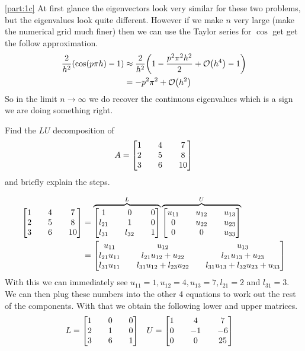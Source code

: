 \documentclass[boxes]{homework}
\begin{document}
\begin{solution}
	\ref{part:1c}
	At first glance the eigenvectors look very similar for these two problems, but the eigenvalues look quite different. However if we make $n$ very large (make the numerical grid much finer) then we can use the Taylor series for $\cos$ get get the follow approximation.
	\begin{align*}
		\frac{2}{h^2}\qty(\cos(p\pi h) - 1) & \approx\frac{2}{h^2}\qty(1 - \frac{p^2\pi^2h^2}{2} + \order{h^4}- 1) \\
		                                    & =-p^2\pi^2 + \order{h^2}
	\end{align*}
	So in the limit $n\to\infty$ we do recover the continuous eigenvalues which is a sign we are doing something right.
\end{solution}

\clearpage

\begin{problem}
Find the $LU$ decomposition of
\begin{equation*}
	A = \mqty[1 && 4 && 7 \\ 2 && 5 && 8 \\ 3 && 6 && 10]
\end{equation*}
and briefly explain the steps.
\end{problem}

\begin{solution}
	\begin{align*}
		\mqty[1 && 4 && 7 \\ 2 && 5 && 8 \\ 3 && 6 && 10] &= \overbrace{\mqty[1 && 0 && 0 \\ l_{21} && 1 && 0 \\ l_{31} && l_{32} && 1]}^L \overbrace{\mqty[u_{11} && u_{12} && u_{13} \\ 0 && u_{22} && u_{23} \\ 0 && 0 && u_{33}]}^U \\
		&= \mqty[u_{11} && u_{12} && u_{13} \\ l_{21}u_{11} && l_{21}u_{12} + u_{22} && l_{21}u_{13} + u_{23} \\ l_{31}u_{11} && l_{31}u_{12} + l_{23}u_{22} && l_{31}u_{13} + l_{32}u_{23} + u_{33}]
	\end{align*}
	With this we can immediately see $u_{11} = 1, u_{12} = 4, u_{13} = 7, l_{21} = 2$ and $l_{31} = 3$. We can then plug these numbers into the other 4 equations to work out the rest of the components. With that we obtain the following lower and upper matrices.
	\begin{align*}
		L &= \mqty[1 && 0 && 0 \\ 2 && 1 && 0 \\ 3 && 6 && 1] & U & = \mqty[1 && 4 && 7 \\ 0 && -1 && -6 \\ 0 && 0 && 25]
	\end{align*}
\end{solution}
\end{document}
